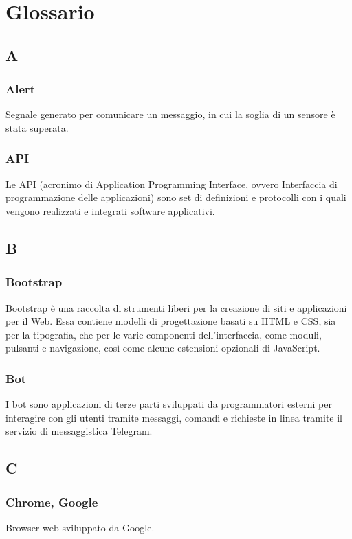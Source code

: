 \appendix
{}

\setcounter{secnumdepth}{1} %
\setcounter{tocdepth}{3} %


\section{Glossario}
\subsection{A}
\subsubsection{Alert} Segnale generato per comunicare un messaggio, in cui la soglia di un sensore è stata superata.
\subsubsection{API} Le API (acronimo di Application Programming Interface, ovvero Interfaccia di programmazione delle applicazioni) sono set di definizioni e protocolli con i quali vengono realizzati e integrati software applicativi.
\subsection{B}
\subsubsection{Bootstrap}  Bootstrap è una raccolta di strumenti liberi per la creazione di siti e applicazioni per il Web. Essa contiene modelli di progettazione basati su HTML e CSS, sia per la tipografia, che per le varie componenti dell'interfaccia, come moduli, pulsanti e navigazione, così come alcune estensioni opzionali di JavaScript.
\subsubsection{Bot}  I bot sono applicazioni di terze parti sviluppati da programmatori esterni per interagire con gli utenti tramite messaggi, comandi e richieste in linea tramite il servizio di messaggistica Telegram.
\subsection{C}
\subsubsection{Chrome, Google}
Browser web sviluppato da Google.
